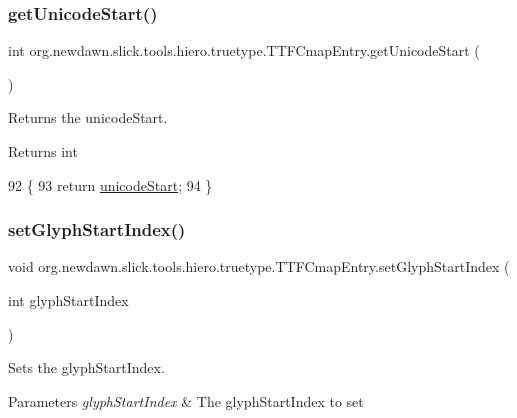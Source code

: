 \subsubsection{\texorpdfstring{get\+Unicode\+Start()}{getUnicodeStart()}}
{\footnotesize\ttfamily int org.\+newdawn.\+slick.\+tools.\+hiero.\+truetype.\+T\+T\+F\+Cmap\+Entry.\+get\+Unicode\+Start (\begin{DoxyParamCaption}{ }\end{DoxyParamCaption})\hspace{0.3cm}{\ttfamily [inline]}}

Returns the unicode\+Start. \begin{DoxyReturn}{Returns}
int 
\end{DoxyReturn}

\begin{DoxyCode}
92                                  \{
93         \textcolor{keywordflow}{return} \mbox{\hyperlink{classorg_1_1newdawn_1_1slick_1_1tools_1_1hiero_1_1truetype_1_1_t_t_f_cmap_entry_abfc190d70995c9dab4cd3a9c42695f61}{unicodeStart}};
94     \}
\end{DoxyCode}
\mbox{\label{classorg_1_1newdawn_1_1slick_1_1tools_1_1hiero_1_1truetype_1_1_t_t_f_cmap_entry_a9654bd6d515a2cdb4d79b82b1b16273f}} 
\subsubsection{\texorpdfstring{set\+Glyph\+Start\+Index()}{setGlyphStartIndex()}}
{\footnotesize\ttfamily void org.\+newdawn.\+slick.\+tools.\+hiero.\+truetype.\+T\+T\+F\+Cmap\+Entry.\+set\+Glyph\+Start\+Index (\begin{DoxyParamCaption}\item[{int}]{glyph\+Start\+Index }\end{DoxyParamCaption})\hspace{0.3cm}{\ttfamily [inline]}}

Sets the glyph\+Start\+Index. 
\begin{DoxyParams}{Parameters}
{\em glyph\+Start\+Index} & The glyph\+Start\+Index to set \\
\hline
\end{DoxyParams}

